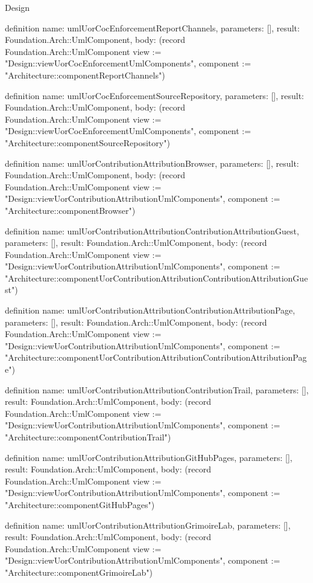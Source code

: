 \begin{lexlean}{Design}
\begin{semanticmodule}
definition{
  name: umlUorCocEnforcementReportChannels,
  parameters: [],
  result: Foundation.Arch::UmlComponent,
  body: (record Foundation.Arch::UmlComponent {view := "Design::viewUorCocEnforcementUmlComponents", component := "Architecture::componentReportChannels"})
}

definition{
  name: umlUorCocEnforcementSourceRepository,
  parameters: [],
  result: Foundation.Arch::UmlComponent,
  body: (record Foundation.Arch::UmlComponent {view := "Design::viewUorCocEnforcementUmlComponents", component := "Architecture::componentSourceRepository"})
}

definition{
  name: umlUorContributionAttributionBrowser,
  parameters: [],
  result: Foundation.Arch::UmlComponent,
  body: (record Foundation.Arch::UmlComponent {view := "Design::viewUorContributionAttributionUmlComponents", component := "Architecture::componentBrowser"})
}

definition{
  name: umlUorContributionAttributionContributionAttributionGuest,
  parameters: [],
  result: Foundation.Arch::UmlComponent,
  body: (record Foundation.Arch::UmlComponent {view := "Design::viewUorContributionAttributionUmlComponents", component := "Architecture::componentUorContributionAttributionContributionAttributionGuest"})
}

definition{
  name: umlUorContributionAttributionContributionAttributionPage,
  parameters: [],
  result: Foundation.Arch::UmlComponent,
  body: (record Foundation.Arch::UmlComponent {view := "Design::viewUorContributionAttributionUmlComponents", component := "Architecture::componentUorContributionAttributionContributionAttributionPage"})
}

definition{
  name: umlUorContributionAttributionContributionTrail,
  parameters: [],
  result: Foundation.Arch::UmlComponent,
  body: (record Foundation.Arch::UmlComponent {view := "Design::viewUorContributionAttributionUmlComponents", component := "Architecture::componentContributionTrail"})
}

definition{
  name: umlUorContributionAttributionGitHubPages,
  parameters: [],
  result: Foundation.Arch::UmlComponent,
  body: (record Foundation.Arch::UmlComponent {view := "Design::viewUorContributionAttributionUmlComponents", component := "Architecture::componentGitHubPages"})
}

definition{
  name: umlUorContributionAttributionGrimoireLab,
  parameters: [],
  result: Foundation.Arch::UmlComponent,
  body: (record Foundation.Arch::UmlComponent {view := "Design::viewUorContributionAttributionUmlComponents", component := "Architecture::componentGrimoireLab"})
}


\end{semanticmodule}
\end{lexlean}
